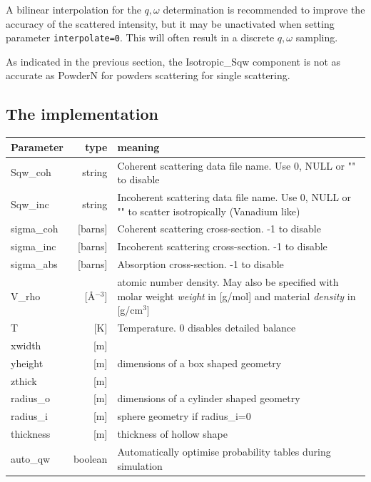 A bilinear interpolation for the $q,\omega$ determination is recommended to improve the accuracy of the scattered intensity, but it may be unactivated when setting parameter \verb+interpolate=0+. This will often result in a discrete $q,\omega$ sampling.

As indicated in the previous section, the Isotropic\_Sqw component is not as accurate as PowderN for powders scattering for single scattering.

\subsection{The implementation}

\begin{table}
  \begin{center}
  {\let\my=\\
    \begin{tabular}{|lr|p{}|}
    \hline
Parameter & type & meaning \\
    \hline
Sqw\_coh   & string              & Coherent scattering data file name. Use 0, NULL or "" to disable  \\
Sqw\_inc   & string              & Incoherent scattering data file name. Use 0, NULL or "" to scatter isotropically (Vanadium like)  \\
sigma\_coh & [barns]      & Coherent scattering cross-section. -1 to disable \\
sigma\_inc & [barns]      & Incoherent scattering cross-section. -1 to disable \\
sigma\_abs & [barns]      & Absorption cross-section. -1 to disable  \\
V\_rho     & [\AA$^{-3}$] & atomic number density. May also be specified with molar weight \emph{weight} in [g/mol] and material \emph{density} in [g/cm$^3$] \\
T          & [K]          & Temperature. 0 disables detailed balance \\
    \hline
xwidth   & [m] & \\
yheight  & [m] & dimensions of a box shaped geometry \\
zthick   & [m] & \\
radius\_o & [m] & dimensions of a cylinder shaped geometry  \\
radius\_i & [m] & sphere geometry if radius\_i=0  \\
thickness& [m] & thickness of hollow shape  \\
    \hline
auto\_qw  & boolean & Automatically optimise probability tables during simulation  \\

\end{tabular}}
\end{center}
\end{table}
